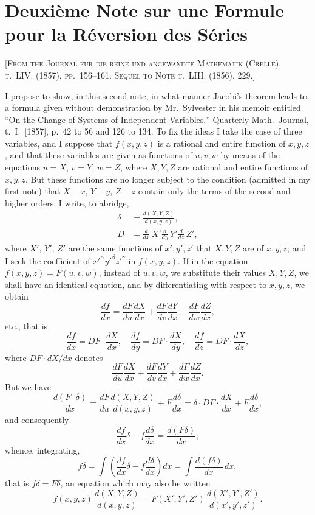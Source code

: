 \documentclass[11pt]{article}
\begin{document}
\section{Deuxi\`eme Note sur une Formule pour la R\'eversion des S\'eries}

\textsc{[From the Journal f\"ur die reine und angewandte Mathematik (Crelle), t.~LIV. (1857), pp.~156--161: Sequel to Note t.~LIII. (1856), 229.]}
\label{paper:234}

I propose to show, in this second note, in what manner Jacobi's theorem leads to a formula given without demonstration by Mr.~Sylvester in his memoir entitled ``On the Change of Systems of Independent Variables,'' Quarterly Math.\ Journal, t.~I.\ [1857], p.~42 to 56 and 126 to 134. To fix the ideas I take the case of three variables, and I suppose that $f(x,y,z)$ is a rational and entire function of $x,y,z$, and that these variables are given as functions of $u,v,w$ by means of the equations $u=X$, $v=Y$, $w=Z$, where $X,Y,Z$ are rational and entire functions of $x,y,z$. But these functions are no longer subject to the condition (admitted in my first note) that $X-x$, $Y-y$, $Z-z$ contain only the terms of the second and higher orders. I write, to abridge,
\begin{align*}
\delta &= \frac{d(X,Y,Z)}{d(x,y,z)}, \\
D &= \frac{d}{dx}\,X'\frac{d}{dy}\,Y'\frac{d}{dz}\,Z',
\end{align*}
where $X'$, $Y'$, $Z'$ are the same functions of $x',y',z'$ that $X,Y,Z$ are of $x,y,z$; and I seek the coefficient of $x'^\alpha y'^\beta z'^\gamma$ in $f(x,y,z)$. If in the equation $f(x,y,z)=F(u,v,w)$, instead of $u,v,w$, we substitute their values $X,Y,Z$, we shall have an identical equation, and by differentiating with respect to $x,y,z$, we obtain
\[
\frac{df}{dx} = \frac{dF}{du}\frac{dX}{dx} + \frac{dF}{dv}\frac{dY}{dx} + \frac{dF}{dw}\frac{dZ}{dx},
\]
etc.; that is
\[
\frac{df}{dx} = DF \cdot \frac{dX}{dx}, \quad
\frac{df}{dy} = DF \cdot \frac{dX}{dy}, \quad
\frac{df}{dz} = DF \cdot \frac{dX}{dz},
\]
where $DF \cdot dX/dx$ denotes
\[
\frac{dF}{du}\frac{dX}{dx} + \frac{dF}{dv}\frac{dY}{dx} + \frac{dF}{dw}\frac{dZ}{dx}.
\]
But we have
\[
\frac{d(F\cdot\delta)}{dx}
= \frac{dF}{du}\frac{d(X,Y,Z)}{d(x,y,z)} + F\frac{d\delta}{dx}
= \delta \cdot DF\cdot\frac{dX}{dx} + F\frac{d\delta}{dx},
\]
and consequently
\[
\frac{df}{dx}\delta - f\frac{d\delta}{dx} = \frac{d(F\delta)}{dx};
\]
whence, integrating,
\[
f\delta = \int\left(\frac{df}{dx}\delta - f\frac{d\delta}{dx}\right)dx
= \int \frac{d(f\delta)}{dx}\,dx,
\]
that is $f\delta = F\delta$, an equation which may also be written
\[
f(x,y,z)\,\frac{d(X,Y,Z)}{d(x,y,z)} = F(X',Y',Z')\,\frac{d(X',Y',Z')}{d(x',y',z')}.
\]
\end{document}
